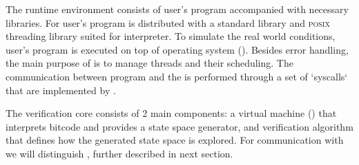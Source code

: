 The runtime environment consists of user's program accompanied with necessary
libraries. For user's program \DIVINE is distributed with a \Cpp{} standard
library and \textsc{posix} threading library suited for \DIVINE interpreter. To
simulate the real world conditions, user's program is executed on top of \DIVINE
operating system (\DIOS). Besides error handling, the main purpose of \DIOS is
to manage threads and their scheduling. The communication between program and
the \DIOS is performed through a set of `syscalls` that are implemented by \DIOS.

The verification core consists of 2 main components: a \DIVINE virtual machine
(\DIVM) that interprets \LLVM bitcode and provides a state space generator, and
verification algorithm that defines how the generated state space is
explored. For communication with \DIVM we will distinguish ,
further described in next section.

